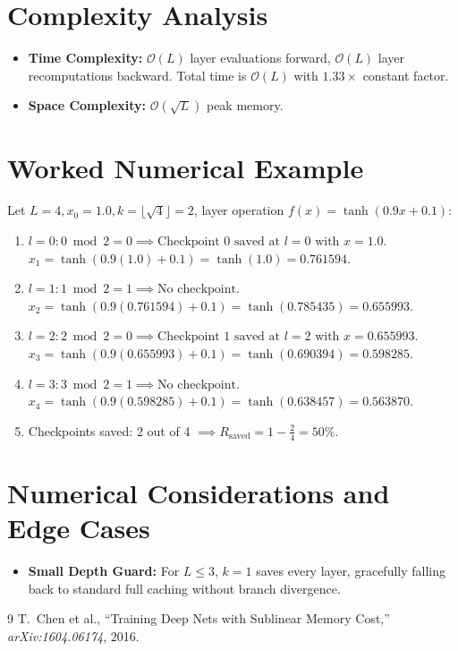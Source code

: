 \documentclass[11pt]{article}
\begin{document}
\section{Complexity Analysis}
\label{sec:complexity}

\begin{itemize}
    \item \textbf{Time Complexity:} $\mathcal{O}(L)$ layer evaluations forward, $\mathcal{O}(L)$ layer recomputations backward. Total time is $\mathcal{O}(L)$ with $1.33\times$ constant factor.
    \item \textbf{Space Complexity:} $\mathcal{O}(\sqrt{L})$ peak memory.
\end{itemize}

\section{Worked Numerical Example}
\label{sec:worked_example}

Let $L = 4, x_0 = 1.0, k = \lfloor\sqrt{4}\rfloor = 2$, layer operation $f(x) = \tanh(0.9x + 0.1)$:
\begin{enumerate}
    \item $l = 0: 0 \bmod 2 = 0 \implies \text{Checkpoint 0 saved at } l=0 \text{ with } x = 1.0$.
    $x_1 = \tanh(0.9(1.0) + 0.1) = \tanh(1.0) = 0.761594$.
    \item $l = 1: 1 \bmod 2 = 1 \implies \text{No checkpoint}$.
    $x_2 = \tanh(0.9(0.761594) + 0.1) = \tanh(0.785435) = 0.655993$.
    \item $l = 2: 2 \bmod 2 = 0 \implies \text{Checkpoint 1 saved at } l=2 \text{ with } x = 0.655993$.
    $x_3 = \tanh(0.9(0.655993) + 0.1) = \tanh(0.690394) = 0.598285$.
    \item $l = 3: 3 \bmod 2 = 1 \implies \text{No checkpoint}$.
    $x_4 = \tanh(0.9(0.598285) + 0.1) = \tanh(0.638457) = 0.563870$.
    \item Checkpoints saved: 2 out of 4 $\implies R_{\mathrm{saved}} = 1 - \frac{2}{4} = 50\%$.
\end{enumerate}

\section{Numerical Considerations and Edge Cases}
\label{sec:numerical}

\begin{itemize}
    \item \textbf{Small Depth Guard:} For $L \le 3$, $k = 1$ saves every layer, gracefully falling back to standard full caching without branch divergence.
\end{itemize}

\begin{thebibliography}{9}
 T.~Chen et al., ``Training Deep Nets with Sublinear Memory Cost,'' \emph{arXiv:1604.06174}, 2016.
\end{thebibliography}
\end{document}
